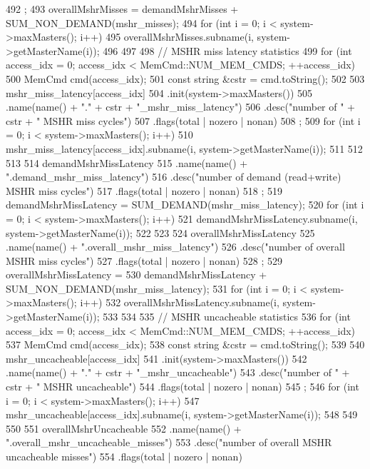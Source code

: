\begin{DoxyCode}
{492         ;
493     overallMshrMisses = demandMshrMisses + SUM_NON_DEMAND(mshr_misses);
494     for (int i = 0; i < system->maxMasters(); i++) {
495         overallMshrMisses.subname(i, system->getMasterName(i));
496     }
497 
498     // MSHR miss latency statistics
499     for (int access_idx = 0; access_idx < MemCmd::NUM_MEM_CMDS; ++access_idx) {
500         MemCmd cmd(access_idx);
501         const string &cstr = cmd.toString();
502 
503         mshr_miss_latency[access_idx]
504             .init(system->maxMasters())
505             .name(name() + "." + cstr + "_mshr_miss_latency")
506             .desc("number of " + cstr + " MSHR miss cycles")
507             .flags(total | nozero | nonan)
508             ;
509         for (int i = 0; i < system->maxMasters(); i++) {
510             mshr_miss_latency[access_idx].subname(i, system->getMasterName(i));
511         }
512     }
513 
514     demandMshrMissLatency
515         .name(name() + ".demand_mshr_miss_latency")
516         .desc("number of demand (read+write) MSHR miss cycles")
517         .flags(total | nozero | nonan)
518         ;
519     demandMshrMissLatency = SUM_DEMAND(mshr_miss_latency);
520     for (int i = 0; i < system->maxMasters(); i++) {
521         demandMshrMissLatency.subname(i, system->getMasterName(i));
522     }
523 
524     overallMshrMissLatency
525         .name(name() + ".overall_mshr_miss_latency")
526         .desc("number of overall MSHR miss cycles")
527         .flags(total | nozero | nonan)
528         ;
529     overallMshrMissLatency =
530         demandMshrMissLatency + SUM_NON_DEMAND(mshr_miss_latency);
531     for (int i = 0; i < system->maxMasters(); i++) {
532         overallMshrMissLatency.subname(i, system->getMasterName(i));
533     }
534 
535     // MSHR uncacheable statistics
536     for (int access_idx = 0; access_idx < MemCmd::NUM_MEM_CMDS; ++access_idx) {
537         MemCmd cmd(access_idx);
538         const string &cstr = cmd.toString();
539 
540         mshr_uncacheable[access_idx]
541             .init(system->maxMasters())
542             .name(name() + "." + cstr + "_mshr_uncacheable")
543             .desc("number of " + cstr + " MSHR uncacheable")
544             .flags(total | nozero | nonan)
545             ;
546         for (int i = 0; i < system->maxMasters(); i++) {
547             mshr_uncacheable[access_idx].subname(i, system->getMasterName(i));
548         }
549     }
550 
551     overallMshrUncacheable
552         .name(name() + ".overall_mshr_uncacheable_misses")
553         .desc("number of overall MSHR uncacheable misses")
554         .flags(total | nozero | nonan)
}
\end{DoxyCode}
